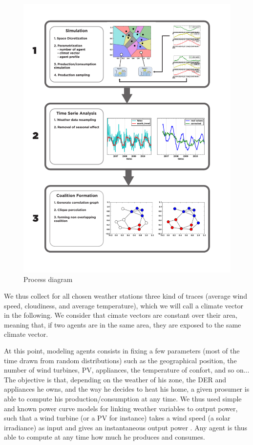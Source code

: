 \documentclass[conference]{IEEEtran}
\begin{document}
\begin{center}
\begin{figure}
\includegraphics[scale=0.45]{figure2/Fig2.pdf}
\caption{Process diagram}
\label{Fig1}
\end{figure}
\end{center}

We thus collect for all chosen weather stations three kind of traces (average wind speed, cloudiness, and average temperature), which we will call a climate vector in the following. We consider that cimate vectors are constant over their area, meaning that, if two agents are in the same area, they are exposed to the same climate vector.

At this point, modeling agents consists in fixing a few parameters (most of the time drawn from random distributions) such as the geographical position, the number of wind turbines, PV, appliances, the temperature of confort, and so on... The objective is that, depending on the weather of his zone, the DER and appliances he owns, and the way he decides to heat his home, a given prosumer is able to compute his production/consumption at any time. We thus used simple and known power curve models for linking weather variables to output power, such that a wind turbine (or a PV for instance) takes a wind speed (a solar irradiance) as input and gives an instantaneous output power \cite{Kota2011} \cite{windturbinemodel}. Any agent is thus able to compute at any time how much he produces and consumes. 
\end{document}
